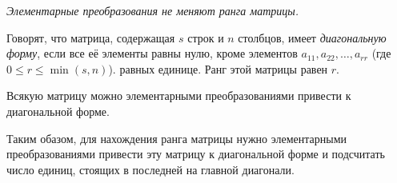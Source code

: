 \documentclass{article}
\begin{document}
\textit{Элементарные преобразования не меняют ранга матрицы.}

Говорят, что матрица, содержащая $s$ строк и $n$ столбцов, имеет
\textit{диагональную форму}, если все её элементы равны нулю, кроме
элементов $a_{11},a_{22},\dots,a_{rr}$ (где $0 \le r \le \min (s, n)$).
равных единице. Ранг этой матрицы равен $r$.

Всякую матрицу можно элементарными преобразованиями привести к диагональной форме.

Таким обазом, для нахождения ранга матрицы нужно элементарными преобразованиями
привести эту матрицу к диагональной форме и подсчитать число единиц, стоящих
в последней на главной диагонали.
\end{document}
